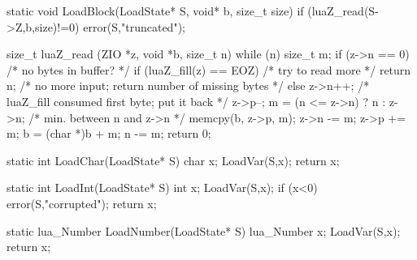 
\begin{LuaCCode}[caption=Definition of \func{LoadBlock} from \filename{lundump.c}]
static void LoadBlock(LoadState* S, void* b, size_t size)
{
 if (luaZ_read(S->Z,b,size)!=0) error(S,"truncated");
}
\end{LuaCCode}


\begin{LuaCCode}[caption=Definition of \func{luaZ\_read} from \filename{lzio.c}]
size_t luaZ_read (ZIO *z, void *b, size_t n) {
  while (n) {
    size_t m;
    if (z->n == 0) {  /* no bytes in buffer? */
      if (luaZ_fill(z) == EOZ)  /* try to read more */
        return n;  /* no more input; return number of missing bytes */
      else {
        z->n++;  /* luaZ_fill consumed first byte; put it back */
        z->p--;
      }
    }
    m = (n <= z->n) ? n : z->n;  /* min. between n and z->n */
    memcpy(b, z->p, m);
    z->n -= m;
    z->p += m;
    b = (char *)b + m;
    n -= m;
  }
  return 0;
}
\end{LuaCCode}


\begin{LuaCCode}[caption=Definition of \func{LoadChar} from \filename{lundump.c}]
static int LoadChar(LoadState* S)
{
 char x;
 LoadVar(S,x);
 return x;
}
\end{LuaCCode}


\begin{LuaCCode}[caption=Definition of \func{LoadInt} from \filename{lundump.c}]
static int LoadInt(LoadState* S)
{
 int x;
 LoadVar(S,x);
 if (x<0) error(S,"corrupted");
 return x;
}
\end{LuaCCode}


\begin{LuaCCode}[caption=Definition of \func{LoadNumber} from \filename{lundump.c}]
static lua_Number LoadNumber(LoadState* S)
{
 lua_Number x;
 LoadVar(S,x);
 return x;
}
\end{LuaCCode}


